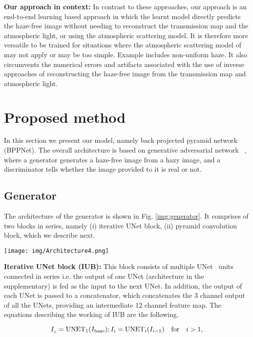 \documentclass[runningheads]{llncs}
\begin{document}
\textbf{Our approach in context: }In contrast to these approaches, our approach is an end-to-end learning based approach in which the learnt model directly predicts the haze-free image without needing to reconstruct the transmission map and the atmospheric light, or using the atmospheric scattering model. It is therefore more versatile to be trained for situations where the atmospheric scattering model of \cite{koschmieder1925theorie} may not apply or may be too simple. Example includes non-uniform haze. It also circumvents the numerical errors and artifacts associated with the use of inverse approaches of reconstructing the haze-free image from the transmission map and atmospheric light. 


\section{Proposed method}\label{sec:proposed}

In this section we present our model, namely back projected pyramid network (BPPNet). The overall architecture is based on generative adversarial network ~\cite{goodfellow2014generative}, where a generator generates a haze-free image from a hazy image, and a discriminator tells whether the image provided to it is real or not. 

\subsection{Generator} The architecture of the generator is shown in Fig. \ref{img:generator}. It comprises of two blocks in series, namely (i) iterative UNet block, (ii) pyramid convolution block, which we describe next.

\begin{figure*}[t]
\texttt{[image: img/Architecture4.png]}
\caption{The architecture of our generator.}
\label{img:generator}
\end{figure*}


{\textbf{Iterative UNet block (IUB):}} This block consists of multiple UNet~\cite{ronneberger2015u} units connected in series i.e. the output of one UNet (architecture in the supplementary) is fed as the input to the next UNet. In addition, the output of each UNet is passed to a concatenator, which concatenates the 3 channel output of all the UNets, providing an intermediate 12 channel feature map. The equations describing the working of IUB are the following.

\begin{equation}
    I_{_1} = {\rm UNET}_1( I_{\rm haze} ); I_{{i}} = {\rm UNET}_{i}( I_{{i-1}}) \quad {\rm{for}} \quad i>1,
\end{equation}
\end{document}

